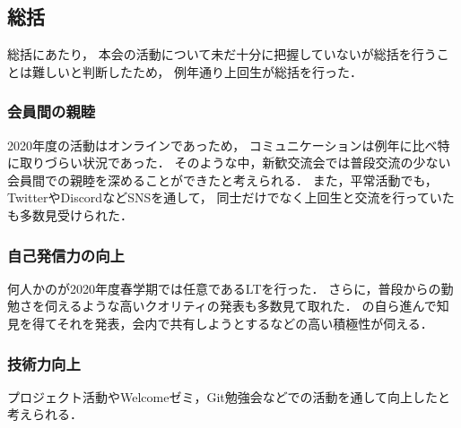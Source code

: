 \subsection*{\firstGrade{}総括}



\firstGrade{}総括にあたり，
本会の活動について未だ十分に把握していない\firstGrade{}が総括を行うことは難しいと判断したため，
例年通り上回生が総括を行った．


\subsubsection*{会員間の親睦}
2020年度の活動はオンラインであっため，
コミュニケーションは例年に比べ特に取りづらい状況であった．
そのような中，新歓交流会では普段交流の少ない会員間での親睦を深めることができたと考えられる．
また，平常活動でも，TwitterやDiscordなどSNSを通して，
\firstGrade{}同士だけでなく上回生と交流を行っていた\firstGrade{}も多数見受けられた．


\subsubsection*{自己発信力の向上}
何人かの\firstGrade{}が2020年度春学期では任意であるLTを行った．
さらに，普段からの勤勉さを伺えるような高いクオリティの発表も多数見て取れた．
\firstGrade{}の自ら進んで知見を得てそれを発表，会内で共有しようとするなどの高い積極性が伺える．


\subsubsection*{技術力向上}
プロジェクト活動やWelcomeゼミ，Git勉強会などでの活動を通して向上したと考えられる．
